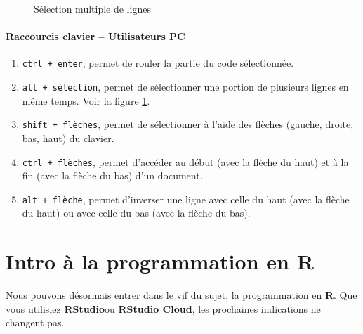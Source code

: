 \documentclass[10.5pt,a4paper]{article}
\begin{document}
      \begin{figure}[H]
      \centering
      \caption{Sélection multiple de lignes}
      \label{altSelect}
      \end{figure}
      
      \paragraph{Raccourcis clavier -- Utilisateurs PC}
      \begin{enumerate}
        \item \texttt{ctrl + enter}, permet de rouler la partie du code sélectionnée.
        \item \texttt{alt + sélection}, permet de sélectionner une portion de plusieurs lignes en même temps. Voir la figure \ref{altSelect}.
        \item \texttt{shift + flèches}, permet de sélectionner à l'aide des flèches (gauche, droite, bas, haut) du clavier.
        \item \texttt{ctrl + flèches}, permet d'accéder au début (avec la flèche du haut) et à la fin (avec la flèche du bas) d'un document.
        \item \texttt{alt + flèche}, permet d'inverser une ligne avec celle du haut (avec la flèche du haut) ou avec celle du bas (avec la flèche du bas).
      \end{enumerate}

\section{Intro à la programmation en R}
Nous pouvons désormais entrer dans le vif du sujet, la programmation en \textbf{R}. Que vous utilisiez \textbf{RStudio}ou \textbf{RStudio Cloud}, les prochaines indications ne changent pas. 
\end{document}
